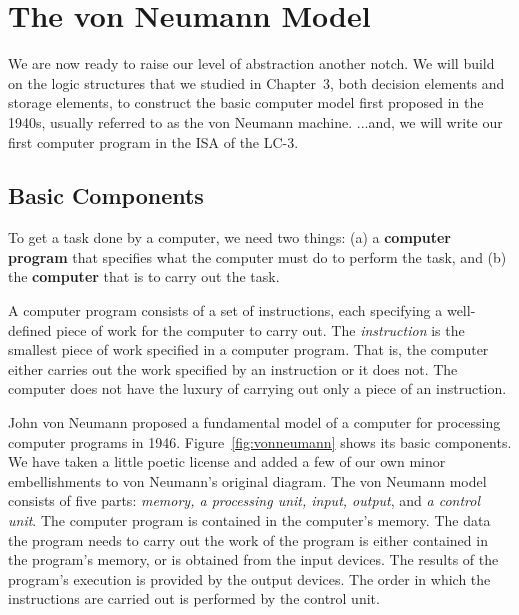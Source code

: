 \documentclass{patt}
\begin{document}
\setcounter{chapter}{3}
\setcounter{page}{97}

\chapter{The von Neumann Model}
\label{chapt:von_neumann}

We are now ready to raise our level of abstraction
another notch.  We will build on the logic structures that we
studied in Chapter~3, both decision elements and storage
elements, to construct the basic computer model first proposed 
in the 1940s, usually referred to as the von Neumann machine. ...and, we will
write our first computer program in the ISA of the LC-3.

\vspace{-6pt}


\section{Basic Components}

To get a task done by a computer, we need two things: (a) 
a {\bf computer program} that specifies what the computer must do to perform 
the task, and (b) the {\bf computer} that is to carry out the task.

A computer program consists of a set of instructions, each specifying a
well-defined piece of work for the computer to carry out.  
The {\em instruction}
is the smallest piece of work specified in a computer program.  That is, the
computer either carries out the work specified by an instruction or it does
not.  The computer does not have the luxury 
of carrying out only a piece of an instruction.

John von Neumann proposed a fundamental model of a computer for processing
computer programs in 1946.  Figure~\ref{fig:vonneumann} shows its basic 
components.  We have taken a little poetic license and added a few of our 
own minor embellishments to von Neumann's original diagram.
The von Neumann model consists of five parts: {\em memory, a processing unit,
input, output}, and {\em a control unit}. The computer program 
is contained in the computer's memory.  The data the program needs to carry out
the work of the program is either contained in the program's memory, or is 
obtained from the input devices.  The results of the program's execution is
provided by the output devices.  The order in which the
instructions are carried out is performed by the control unit.
\end{document}
